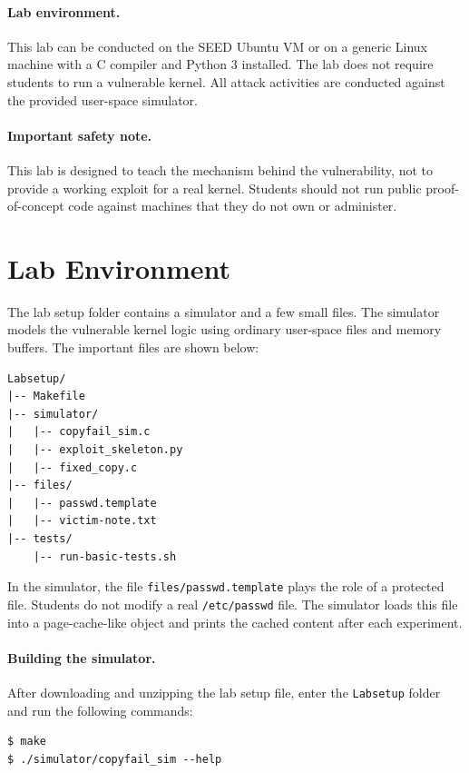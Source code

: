 \paragraph{Lab environment.}
This lab can be conducted on the SEED Ubuntu VM or on a generic Linux machine
with a C compiler and Python 3 installed. The lab does not require students to
run a vulnerable kernel. All attack activities are conducted against the
provided user-space simulator.

\paragraph{Important safety note.}
This lab is designed to teach the mechanism behind the vulnerability, not to
provide a working exploit for a real kernel. Students should not run public
proof-of-concept code against machines that they do not own or administer.


\section{Lab Environment}

The lab setup folder contains a simulator and a few small files. The simulator
models the vulnerable kernel logic using ordinary user-space files and memory
buffers. The important files are shown below:

\begin{lstlisting}
Labsetup/
|-- Makefile
|-- simulator/
|   |-- copyfail_sim.c
|   |-- exploit_skeleton.py
|   |-- fixed_copy.c
|-- files/
|   |-- passwd.template
|   |-- victim-note.txt
|-- tests/
    |-- run-basic-tests.sh
\end{lstlisting}

In the simulator, the file \texttt{files/passwd.template} plays the role of a
protected file. Students do not modify a real \texttt{/etc/passwd} file. The
simulator loads this file into a page-cache-like object and prints the cached
content after each experiment.

\paragraph{Building the simulator.}
After downloading and unzipping the lab setup file, enter the
\texttt{Labsetup} folder and run the following commands:

\begin{lstlisting}
$ make
$ ./simulator/copyfail_sim --help
\end{lstlisting}

